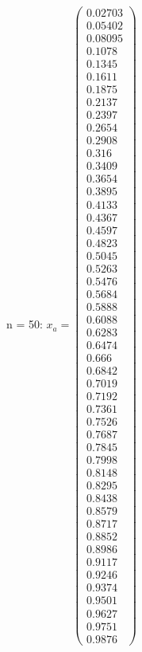 \documentclass{udpreport}
\begin{document}
\begin{enumerate}
\begin{enumerate}
\begin{itemize}
\begin{itemize}
				n = 50: $x_{a} = \left(\begin{array}{c} 0.02703\\ 0.05402\\ 0.08095\\ 0.1078\\ 0.1345\\ 0.1611\\ 0.1875\\ 0.2137\\ 0.2397\\ 0.2654\\ 0.2908\\ 0.316\\ 0.3409\\ 0.3654\\ 0.3895\\ 0.4133\\ 0.4367\\ 0.4597\\ 0.4823\\ 0.5045\\ 0.5263\\ 0.5476\\ 0.5684\\ 0.5888\\ 0.6088\\ 0.6283\\ 0.6474\\ 0.666\\ 0.6842\\ 0.7019\\ 0.7192\\ 0.7361\\ 0.7526\\ 0.7687\\ 0.7845\\ 0.7998\\ 0.8148\\ 0.8295\\ 0.8438\\ 0.8579\\ 0.8717\\ 0.8852\\ 0.8986\\ 0.9117\\ 0.9246\\ 0.9374\\ 0.9501\\ 0.9627\\ 0.9751\\ 0.9876 \end{array}\right)$	
				

\end{itemize}
\end{itemize}
\end{enumerate}
\end{enumerate}
\end{document}
